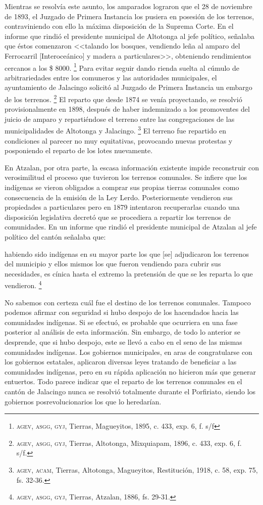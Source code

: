 \documentclass[14pt,twoside,final]{extbook} %
\let\oldfootnote\footnote
\renewcommand\footnote[1]{%
\oldfootnote{\hspace{1mm}#1}}
\begin{document}
Mientras se resolvía este asunto, los amparados lograron que el 28 de noviembre de 1893, el Juzgado de Primera Instancia los pusiera en posesión de los terrenos, contraviniendo con ello la máxima disposición de la Suprema Corte. En el informe que rindió el presidente municipal de Altotonga al jefe político, señalaba que éstos comenzaron <<talando los bosques, vendiendo leña al amparo del Ferrocarril [Interoceánico] y madera a particulares>>, obteniendo rendimientos cercanos a los \$ 8000.\footnote{\textsc{agev, asgg, gyj}, Tierras, Magueyitos, 1895, c. 433, exp. 6, f. s/f} Para evitar seguir dando rienda suelta al cúmulo de arbitrariedades entre los comuneros y las autoridades municipales, el ayuntamiento de Jalacingo solicitó al Juzgado de Primera Instancia un embargo de los terrenos.\footnote{\textsc{agev, asgg, gyj}, Tierras, Altotonga, Mixquiapam, 1896, c. 433, exp. 6, f. s/f.} El reparto que desde 1874 se venía proyectando, se resolvió provisionalmente en 1898, después de haber indemnizado a los promoventes del juicio de amparo y repartiéndose el terreno entre las congregaciones de las municipalidades de Altotonga y Jalacingo.\footnote{\textsc{agev, acam}, Tierras, Altotonga, Magueyitos, Restitución, 1918, c. 58, exp. 75, fs. 32-36.} El terreno fue repartido en condiciones al parecer no muy equitativas, provocando nuevas protestas y posponiendo el reparto de los lotes nuevamente.

En Atzalan, por otra parte, la escasa información existente impide reconstruir con verosimilitud el proceso que tuvieron los terrenos comunales. Se infiere que los indígenas se vieron obligados a comprar sus propias tierras comunales como consecuencia de la emisión de la Ley Lerdo. Posteriormente vendieron sus propiedades a particulares pero en 1879 intentaron recuperarlas cuando una disposición legislativa decretó que se procediera a repartir los terrenos de comunidades. En un informe que rindió el presidente municipal de Atzalan al jefe político del cantón señalaba que:
\begin{quoting}
habiendo sido indígenas en su mayor parte los que [se] adjudicaron los terrenos del municipio y ellos mismos los que fueron vendiendo para cubrir sus necesidades, es cínica hasta el extremo la pretensión de que se les reparta lo que vendieron.\footnote{\textsc{agev, asgg, gyj}, Tierras, Atzalan, 1886, fs. 29-31.}
\end{quoting}
No sabemos con certeza cuál fue el destino de los terrenos comunales. Tampoco podemos afirmar con seguridad si hubo despojo de los hacendados hacia las comunidades indígenas. Si se efectuó, es probable que ocurriera en una fase posterior al análisis de esta información. Sin embargo, de todo lo anterior se desprende, que si hubo despojo, este se llevó a cabo en el seno de las mismas comunidades indígenas. Los gobiernos municipales, en aras de congratularse con los gobiernos estatales, aplicaron
diversas leyes tratando de beneficiar a las comunidades indígenas, pero en su rápida aplicación no hicieron más que generar entuertos. Todo parece indicar que el reparto de los terrenos comunales en el cantón de Jalacingo nunca se resolvió totalmente durante el Porfiriato, siendo los gobiernos posrevolucionarios los que lo heredarían.
\end{document}
